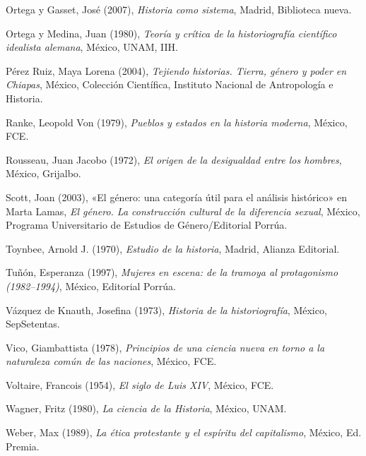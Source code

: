Ortega y Gasset, José (2007), \textit{Historia como sistema}, Madrid,
Biblioteca nueva. 


Ortega y Medina, Juan (1980), \textit{Teoría y crítica de la historiografía
científico idealista alemana}, México, UNAM, IIH\@.


Pérez Ruiz, Maya Lorena (2004), \textit{Tejiendo historias. Tierra, género y
poder en Chiapas}, México, Colección Científica, Instituto Nacional de
Antropología e Historia. 


Ranke, Leopold Von (1979), \textit{Pueblos y estados en la historia moderna},
México, FCE\@. 


Rousseau, Juan Jacobo (1972), \textit{El origen de la desigualdad entre los
hombres}, México, Grijalbo. 

Scott, Joan (2003), «El género: una categoría útil para el análisis histórico»
en Marta Lamas, \textit{El género. La construcción cultural de la diferencia
sexual}, México, Programa Universitario de Estudios de Género\slash{}Editorial
Porrúa.


Toynbee, Arnold J. (1970), \textit{Estudio de la historia}, Madrid, Alianza Editorial. 


Tuñón, Esperanza (1997), \textit{Mujeres en escena: de la tramoya al
protagonismo (1982--1994)}, México, Editorial Porrúa. 


Vázquez de Knauth, Josefina (1973), \textit{Historia de la historiografía},
México, SepSetentas.


Vico, Giambattista (1978), \textit{Principios de una ciencia nueva en torno a
la naturaleza común de las naciones}, México, FCE\@. 

Voltaire, Francois (1954), \textit{El siglo de Luis XIV}, México, FCE\@.

Wagner, Fritz (1980), \textit{La ciencia de la Historia}, México, UNAM\@.

Weber, Max (1989), \textit{La ética protestante y el espíritu del capitalismo},
México, Ed\@. Premia.
\newpage
\thispagestyle{empty}
\phantom{abc}


